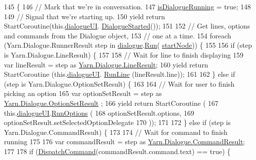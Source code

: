 \begin{DoxyCode}
145         \{
146             \textcolor{comment}{// Mark that we're in conversation.}
147             \hyperlink{a00051_a9eb0fd7b600a4667595042832af1d655}{isDialogueRunning} = \textcolor{keyword}{true};
148 
149             \textcolor{comment}{// Signal that we're starting up.}
150             yield \textcolor{keywordflow}{return} StartCoroutine(this.\hyperlink{a00051_ac87fdc65b0be57868f80c0fcd62ffd6d}{dialogueUI}.
      \hyperlink{a00052_af9d88ca81ac536d43046ca6572e3ff54}{DialogueStarted}());
151 
152             \textcolor{comment}{// Get lines, options and commands from the Dialogue object,}
153             \textcolor{comment}{// one at a time.}
154             \textcolor{keywordflow}{foreach} (Yarn.Dialogue.RunnerResult step in \hyperlink{a00051_a4f9712a847ca6d53ec8d2dd64dfcffd8}{dialogue}.\hyperlink{a00050_aead84ee50cb113ca45724894290ce9c2}{Run}(
      \hyperlink{a00051_a61c92b8d2228d01d8ac123b73bbb41a0}{startNode})) \{
155 
156                 \textcolor{keywordflow}{if} (step is Yarn.Dialogue.LineResult) \{
157 
158                     \textcolor{comment}{// Wait for line to finish displaying}
159                     var lineResult = step as \hyperlink{a00064}{Yarn.Dialogue.LineResult};
160                     yield \textcolor{keywordflow}{return} StartCoroutine (this.\hyperlink{a00051_ac87fdc65b0be57868f80c0fcd62ffd6d}{dialogueUI}.
      \hyperlink{a00052_a754c6dd0bc67895d11f878fe4477d698}{RunLine} (lineResult.line));
161 
162                 \} \textcolor{keywordflow}{else} \textcolor{keywordflow}{if} (step is Yarn.Dialogue.OptionSetResult) \{
163 
164                     \textcolor{comment}{// Wait for user to finish picking an option}
165                     var optionSetResult = step as \hyperlink{a00074}{Yarn.Dialogue.OptionSetResult}
      ;
166                     yield \textcolor{keywordflow}{return} StartCoroutine (
167                         this.\hyperlink{a00051_ac87fdc65b0be57868f80c0fcd62ffd6d}{dialogueUI}.\hyperlink{a00052_ac5b29079f638f2ceb078627ef1e60004}{RunOptions} (
168                         optionSetResult.options,
169                         optionSetResult.setSelectedOptionDelegate
170                     ));
171 
172                 \} \textcolor{keywordflow}{else} \textcolor{keywordflow}{if} (step is Yarn.Dialogue.CommandResult) \{
173 
174                     \textcolor{comment}{// Wait for command to finish running}
175 
176                     var commandResult = step as \hyperlink{a00041}{Yarn.Dialogue.CommandResult};
177 
178                     \textcolor{keywordflow}{if} (\hyperlink{a00051_a7b200f8ddcf77f50906a6341aadeb671}{DispatchCommand}(commandResult.command.text) == \textcolor{keyword}{true}) \{

\end{DoxyCode}
